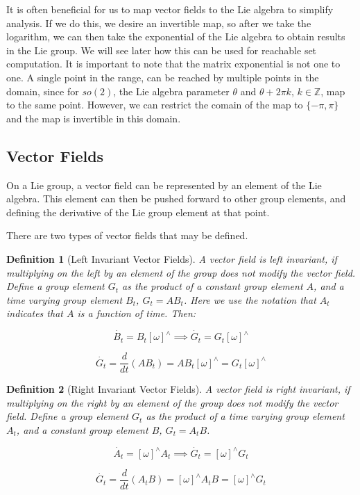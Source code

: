 \documentclass{book}
\newtheorem{definition}{Definition}
\begin{document}
It is often beneficial for us to map vector fields to the Lie algebra to simplify
analysis. If we do this, we desire an invertible map, so after we take the logarithm,
we can then take the exponential of the Lie algebra to obtain results in the Lie group.
We will see later how this can be used for reachable set computation. It is important
to note that the matrix exponential is not one to one. A single point in the range, can be
reached by multiple points in the domain, since for $so(2)$, the Lie algebra parameter $\theta$ 
and $\theta + 2\pi k$, $k\in \mathbb{Z}$, map to the same point. However, we can restrict the
comain of the map to $\{-\pi, \pi\}$ and the map is invertible in this domain.

\subsection*{Vector Fields}

On a Lie group, a vector field can be represented by an element of the Lie algebra. This element
can then be pushed forward to other group elements, and defining the derivative of the Lie group
element at that point.

There are two types of vector fields that may be defined.

\begin{definition}[Left Invariant Vector Fields]
A vector field is left invariant, if multiplying on the left by an element of the
group does not modify the vector field. Define a group element $G_t$ as the product of a constant group element $A$, and a time
varying group element $B_t$, $G_t = A B_t$. Here we use the notation that
 $A_t$ indicates that $A$ is a function of time. Then:

$$\dot{B_t} = B_t [\omega]^{\wedge} \implies \dot{G_t} = G_t [\omega]^{\wedge} $$

$$\dot{G_t} = \dfrac{d}{dt} \left(A B_t \right) = A B_t [\omega]^{\wedge} = G_t [\omega]^{\wedge} $$
\end{definition}

\begin{definition}[Right Invariant Vector Fields]
A vector field is right invariant, if multiplying on the right by an element of the
group does not modify the vector field. Define a group element $G_t$ as the product of a time
varying group element $A_t$, and a constant group element $B$, $G_t = A_t B$.

$$\dot{A_t} = [\omega]^{\wedge} A_t  \implies \dot{G_t} = [\omega]^{\wedge} G_t$$

$$\dot{G_t} = \dfrac{d}{dt} \left(A_t B \right) = [\omega]^{\wedge}  A_t B = [\omega]^{\wedge} G_t$$
\end{definition}
\end{document}
